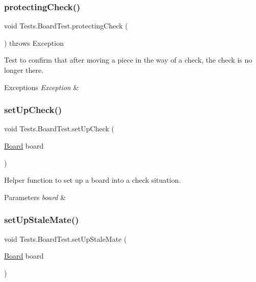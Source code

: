 \subsubsection{\texorpdfstring{protecting\+Check()}{protectingCheck()}}
{\footnotesize\ttfamily void Tests.\+Board\+Test.\+protecting\+Check (\begin{DoxyParamCaption}{ }\end{DoxyParamCaption}) throws Exception}

Test to confirm that after moving a piece in the way of a check, the check is no longer there. 
\begin{DoxyExceptions}{Exceptions}
{\em Exception} & \\
\hline
\end{DoxyExceptions}
\hypertarget{class_tests_1_1_board_test_a33895f492ce1d7dfba81b325fa351da0}{}\label{class_tests_1_1_board_test_a33895f492ce1d7dfba81b325fa351da0} 
\subsubsection{\texorpdfstring{set\+Up\+Check()}{setUpCheck()}}
{\footnotesize\ttfamily void Tests.\+Board\+Test.\+set\+Up\+Check (\begin{DoxyParamCaption}\item[{\hyperlink{class_model_1_1_board}{Board}}]{board }\end{DoxyParamCaption})}

Helper function to set up a board into a check situation. 
\begin{DoxyParams}{Parameters}
{\em board} & \\
\hline
\end{DoxyParams}
\hypertarget{class_tests_1_1_board_test_a6e66cbfe15e55e7f65f37a85fd8126b2}{}\label{class_tests_1_1_board_test_a6e66cbfe15e55e7f65f37a85fd8126b2} 
\subsubsection{\texorpdfstring{set\+Up\+Stale\+Mate()}{setUpStaleMate()}}
{\footnotesize\ttfamily void Tests.\+Board\+Test.\+set\+Up\+Stale\+Mate (\begin{DoxyParamCaption}\item[{\hyperlink{class_model_1_1_board}{Board}}]{board }\end{DoxyParamCaption})}

